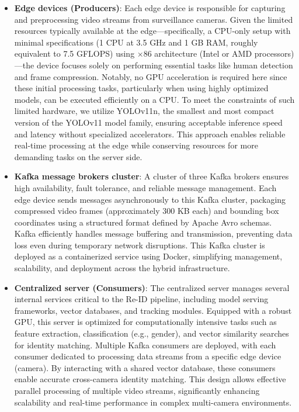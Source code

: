 \documentclass[../main.tex]{subfiles}
\begin{document}
\begin{itemize}
    \item \textbf{Edge devices (Producers)}: Each edge device is responsible for capturing and preprocessing video streams from surveillance cameras. Given the limited resources typically available at the edge—specifically, a CPU-only setup with minimal specifications (1 CPU at 3.5 GHz and 1 GB RAM, roughly equivalent to 7.5 GFLOPS) using $\times86$ architecture (Intel or AMD processors)—the device focuses solely on performing essential tasks like human detection and frame compression. Notably, no GPU acceleration is required here since these initial processing tasks, particularly when using highly optimized models, can be executed efficiently on a CPU. To meet the constraints of such limited hardware, we utilize YOLOv11n, the smallest and most compact version of the YOLOv11 model family, ensuring acceptable inference speed and latency without specialized accelerators. This approach enables reliable real-time processing at the edge while conserving resources for more demanding tasks on the server side.

    
    \item \textbf{Kafka message brokers cluster}: A cluster of three Kafka brokers ensures high availability, fault tolerance, and reliable message management. Each edge device sends messages asynchronously to this Kafka cluster, packaging compressed video frames (approximately 300 KB each) and bounding box coordinates using a structured format defined by Apache Avro schemas. Kafka efficiently handles message buffering and transmission, preventing data loss even during temporary network disruptions. This Kafka cluster is deployed as a containerized service using Docker, simplifying management, scalability, and deployment across the hybrid infrastructure.
    
    \item \textbf{Centralized server (Consumers)}: The centralized server manages several internal services critical to the Re-ID pipeline, including model serving frameworks, vector databases, and tracking modules. Equipped with a robust GPU, this server is optimized for computationally intensive tasks such as feature extraction, classification (e.g., gender), and vector similarity searches for identity matching. Multiple Kafka consumers are deployed, with each consumer dedicated to processing data streams from a specific edge device (camera). By interacting with a shared vector database, these consumers enable accurate cross-camera identity matching. This design allows effective parallel processing of multiple video streams, significantly enhancing scalability and real-time performance in complex multi-camera environments.
\end{itemize}
\end{document}
